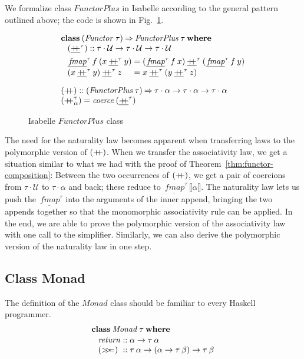 \documentclass{sigplanconf}
\newcommand{\hsapp}{\mathbin{+\mkern-7mu+}}
\newcommand{\hsbind}{\mathbin{>\mkern-6mu>\mkern-6.5mu=}}
\newcommand{\To}{\mathbin{\Rightarrow}}
\newcommand{\U}{\ensuremath{\mathcal{U}}}
\newcommand{\univ}[1]{\ensuremath{\underline{#1}}}
\newcommand{\REP}[1]{\ensuremath{\llbracket#1\rrbracket}}
\newcommand{\kwd}[1]{\mathbf{#1}}
\newcommand{\hsc}[1]{\ensuremath{\mathit{#1}}}
\newcommand{\hscoerce}{\hsc{coerce}}
\newcommand{\fmap}{\,\hsc{fmap}} %
\newcommand{\fmapU}{\univ{\fmap}}
\newcommand{\hsappU}{\mathbin{\univ{\hsapp}}}
\newcommand{\tA}{\alpha}
\newcommand{\tB}{\beta}
\newcommand{\tT}{\tau}
\theoremstyle{definition}
\begin{document}
We formalize class \hsc{FunctorPlus} in Isabelle according to the general pattern outlined above; the code is shown in Fig.~\ref{fig:functorplus}.

\begin{figure}
\begin{align*}
  & \kwd{class}\:(\hsc{Functor}\:\tT) \To \hsc{FunctorPlus}\:\tT\:\kwd{where}
  \\[-\jot]
  & \hspace{8pt} (\hsappU^\tT) :: \tT\cdot\U \to \tT\cdot\U \to \tT\cdot\U \\
  & \hspace{8pt}
  \begin{alignedat}{2}
    & \fmapU^\tT\,f\:(x \hsappU^\tT y) &&= (\fmapU^\tT\,f\:x) \hsappU^\tT (\fmapU^\tT\,f\:y)
    \\[-\jot]
    & (x \hsappU^\tT y) \hsappU^\tT z &&= x \hsappU^\tT (y \hsappU^\tT z)
  \end{alignedat}
  \\[\medskipamount]
  & (\hsapp) :: (\hsc{FunctorPlus}\:\tT) \To \tT\cdot\tA \to \tT\cdot\tA \to \tT\cdot\tA
  \\[-\jot]
  & (\hsapp^\tT_\tA) = \hscoerce\:(\hsappU^\tT)
\end{align*}
\caption{Isabelle \hsc{FunctorPlus} class}
\label{fig:functorplus}
\end{figure}

The need for the naturality law becomes apparent when transferring laws to the polymorphic version of $(\hsapp)$. When we transfer the associativity law, we get a situation similar to what we had with the proof of Theorem~\ref{thm:functor-composition}: Between the two occurrences of $(\hsapp)$, we get a pair of coercions from $\tT\cdot\U$ to $\tT\cdot\tA$ and back; these reduce to $\fmapU^\tT\,\REP{\tA}$. The naturality law lets us push the $\fmapU^\tT$ into the arguments of the inner append, bringing the two appends together so that the monomorphic associativity rule can be applied. In the end, we are able to prove the polymorphic version of the associativity law with one call to the simplifier. Similarly, we can also derive the polymorphic version of the naturality law in one step.

\subsection{Class Monad}
\label{sec:monad}

The definition of the \hsc{Monad} class should be familiar to every Haskell programmer.
%
\begin{align*}
  &\kwd{class}\:\hsc{Monad}\:\tT\:\kwd{where} \\[-\jot]
  &\hspace{8pt}
  \begin{alignedat}{2}
    & \hsc{return}&&::\tA\to\tT\:\tA \\[-\jot]
    & (\hsbind)&&::\tT\:\tA\to(\tA\to\tT\:\tB)\to\tT\:\tB
  \end{alignedat}
\end{align*}
\end{document}

